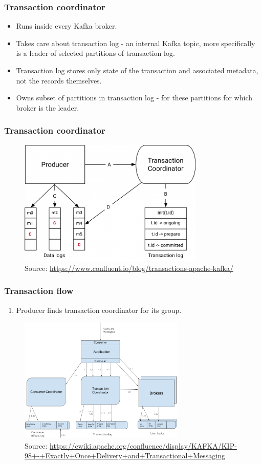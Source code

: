 \documentclass[10pt,utf8]{beamer}
\begin{document}
\begin{frame}
    \frametitle{Transaction coordinator}
    \begin{itemize}
        \item Runs inside every Kafka broker.
        \item Takes care about transaction log - an internal Kafka topic, more specifically is a leader of selected partitions of transaction log.
        \item Transaction log stores only state of the transaction and associated metadata, not the records themselves.
        \item Owns subset of partitions in transaction log - for these partitions for which broker is the leader.
    \end{itemize}
\end{frame}

\begin{frame}
    \frametitle{Transaction coordinator}
    \begin{figure}
        \centering
        \includegraphics[height=6cm]{./img/kafka_transactions.eps}
        \caption{\tiny{Source: \url{https://www.confluent.io/blog/transactions-apache-kafka/}}}
    \end{figure}
\end{frame}

\begin{frame}
    \frametitle{Transaction flow}
    \begin{enumerate}
        \item Producer finds transaction coordinator for its group.
    \end{enumerate}
    \begin{figure}
        \centering
        \includegraphics[height=6cm]{./img/tx_flow.eps}
        \caption{\tiny{Source: \url{https://cwiki.apache.org/confluence/display/KAFKA/KIP-98+-+Exactly+Once+Delivery+and+Transactional+Messaging}}}
    \end{figure}
\end{frame}
\end{document}
